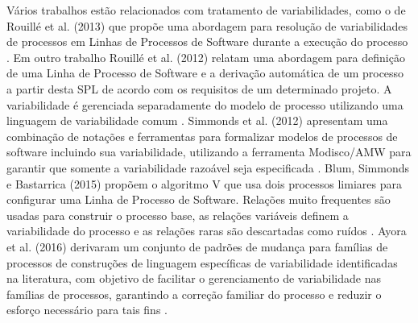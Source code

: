 Vários trabalhos estão relacionados com tratamento de variabilidades, como o de Rouillé et al. (2013) que propõe uma abordagem para resolução de variabilidades de processos em Linhas de Processos de Software durante a execução do processo \cite{14rouille:2013}. Em outro trabalho Rouillé et al. (2012) relatam uma abordagem para definição de uma Linha de Processo de Software e a derivação automática de um processo a partir desta SPL de acordo com os requisitos de um determinado projeto. A variabilidade é gerenciada separadamente do modelo de processo utilizando uma linguagem de variabilidade comum \cite{2rouille:2012}. Simmonds et al. (2012) apresentam uma combinação de notações e ferramentas para formalizar modelos de processos de software incluindo sua variabilidade, utilizando a ferramenta Modisco/AMW para garantir que somente a variabilidade razoável seja especificada \cite{12simmonds:2012}. Blum, Simmonds e Bastarrica (2015) propõem o algoritmo V que usa dois processos limiares para configurar uma Linha de Processo de Software. Relações muito frequentes são usadas para construir o processo base, as relações variáveis definem a variabilidade do processo e as relações raras são descartadas como ruídos \cite{15blum:2015}. Ayora et al. (2016) derivaram um conjunto de padrões de mudança para famílias de processos de construções de linguagem específicas de variabilidade identificadas na literatura, com objetivo de facilitar o gerenciamento de variabilidade nas famílias de processos, garantindo a correção familiar do processo e reduzir o esforço necessário para tais fins \cite{19ayora:2016}.


